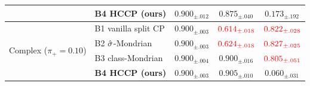 \begin{table}[h]
\begin{tabular}{llccc}
 & \textbf{B4 HCCP (ours)}        & $0.900_{\pm .012}$ & $\mathbf{0.875_{\pm .040}}$         & $\mathbf{0.173_{\pm .192}}$ \\
\midrule
\multirow{4}{*}{Complex ($\pi_{+} = 0.10$)}
 & B1 vanilla split CP            & $0.900_{\pm .003}$ & $\textcolor{red}{0.614_{\pm .018}}$ & $\textcolor{red}{0.822_{\pm .028}}$ \\
 & B2 $\hat{\sigma}$-Mondrian            & $0.900_{\pm .003}$ & $\textcolor{red}{0.624_{\pm .018}}$ & $\textcolor{red}{0.827_{\pm .025}}$ \\
 & B3 class-Mondrian              & $0.900_{\pm .004}$ & $0.900_{\pm .016}$                  & $\textcolor{red}{0.805_{\pm .051}}$ \\
 & \textbf{B4 HCCP (ours)}        & $0.900_{\pm .003}$ & $\mathbf{0.905_{\pm .010}}$         & $\mathbf{0.060_{\pm .031}}$ \\
\bottomrule
\end{tabular}
\end{table}

